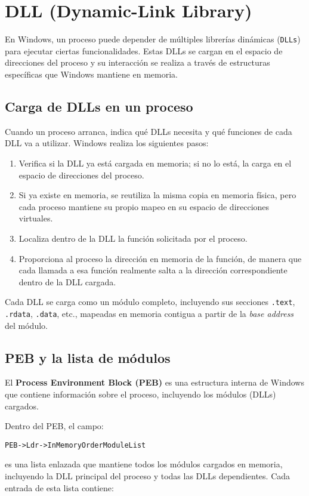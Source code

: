 \section{DLL (Dynamic-Link Library)}
En Windows, un proceso puede depender de múltiples librerías dinámicas 
(\texttt{DLLs}) para ejecutar ciertas funcionalidades. Estas DLLs se cargan en 
el espacio de direcciones del proceso y su interacción se realiza a través de 
estructuras específicas que Windows mantiene en memoria.

\subsection{Carga de DLLs en un proceso}
Cuando un proceso arranca, indica qué DLLs necesita y qué funciones de cada DLL 
va a utilizar. Windows realiza los siguientes pasos:

\begin{enumerate}
    \item Verifica si la DLL ya está cargada en memoria; si no lo está, la carga 
    en el espacio de direcciones del proceso.
    \item Si ya existe en memoria, se reutiliza la misma copia en memoria física, 
    pero cada proceso mantiene su propio mapeo en su espacio de direcciones virtuales.
    \item Localiza dentro de la DLL la función solicitada por el proceso.
    \item Proporciona al proceso la dirección en memoria de la función, de 
    manera que cada llamada a esa función realmente salta a la dirección 
    correspondiente dentro de la DLL cargada.
\end{enumerate}

Cada DLL se carga como un módulo completo, incluyendo sus secciones 
\texttt{.text}, \texttt{.rdata}, \texttt{.data}, etc., mapeadas en memoria 
contigua a partir de la \emph{base address} del módulo.

\subsection{PEB y la lista de módulos}
El \textbf{Process Environment Block (PEB)} es una estructura interna de Windows 
que contiene información sobre el proceso, incluyendo los módulos (DLLs) 
cargados. 

Dentro del PEB, el campo:
\begin{verbatim}
PEB->Ldr->InMemoryOrderModuleList
\end{verbatim}
es una lista enlazada que mantiene todos los módulos cargados en memoria, 
incluyendo la DLL principal del proceso y todas las DLLs dependientes. Cada 
entrada de esta lista contiene:

